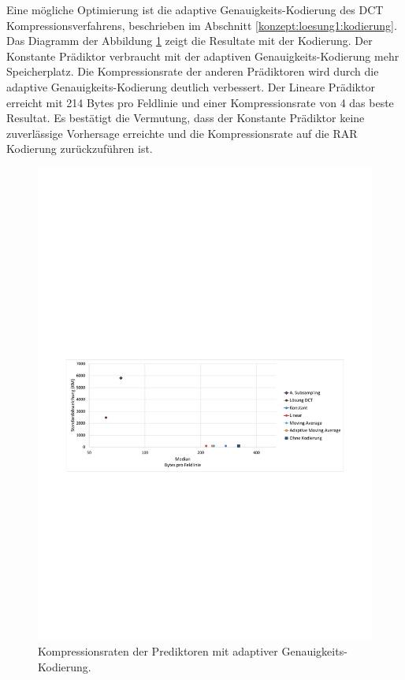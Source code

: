 Eine mögliche Optimierung ist die adaptive Genauigkeits-Kodierung des DCT Kompressionsverfahrens, beschrieben im Abschnitt \ref{konzept:loesung1:kodierung}. Das Diagramm der Abbildung \ref{resultate:loesung2:simple:resultate_byte} zeigt die Resultate mit der Kodierung. Der Konstante Prädiktor verbraucht mit der adaptiven Genauigkeits-Kodierung mehr Speicherplatz. Die Kompressionsrate der anderen Prädiktoren wird durch die adaptive Genauigkeits-Kodierung deutlich verbessert. Der Lineare Prädiktor erreicht mit 214 Bytes pro Feldlinie und einer Kompressionsrate von 4 das beste Resultat. Es bestätigt die Vermutung, dass der Konstante Prädiktor keine zuverlässige Vorhersage erreichte und die Kompressionsrate auf die RAR Kodierung zurückzuführen ist.

\begin{figure}[!htbp]
	\center
	\includegraphics[trim = 1.8cm 11cm 1.8cm 12.5cm, clip=true,width=1\textwidth,keepaspectratio]{./pictures/resultate/loesung2/variante0/resultate_byte.pdf}
	\caption{Kompressionsraten der Prediktoren mit adaptiver Genauigkeits-Kodierung.}
	\label{resultate:loesung2:simple:resultate_byte}
\end{figure}

